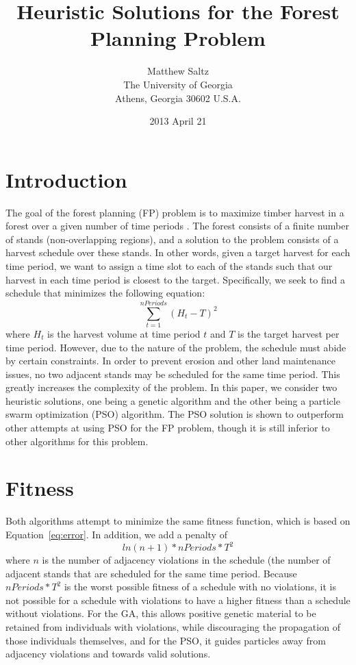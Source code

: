 \documentclass[12pt,fleqn]{article}
\title{\bf Heuristic Solutions for the Forest Planning Problem}
\author{Matthew Saltz \\
        The University of Georgia \\
        Athens, Georgia 30602 U.S.A.}
\date{2013 April 21}
\begin{document}
\maketitle
\section{Introduction}
The goal of the forest planning (FP) problem is to maximize timber harvest
in a forest over a given number of time periods \cite{bettinger}. The forest consists
of a finite number of stands (non-overlapping regions), and a solution
to the problem consists of a harvest schedule over these stands.  In 
other words, given a target harvest for each time period, 
we want to assign a time slot to each of the stands such that our 
harvest in each time period is closest to the target.  Specifically,
we seek to find a schedule that minimizes the following equation:
\begin{equation}
\sum_{t = 1}^{nPeriods} (H_t - T)^2 
\label{eq:error}
\end{equation}
where $H_t$ is the harvest volume at time period $t$ and $T$ is the target
harvest per time period. However, due to the nature of the problem,
the schedule must abide by certain constraints. In order to prevent
erosion and other land maintenance issues, no two adjacent stands
may be scheduled for the same time period. This greatly increases
the complexity of the problem.  In this paper, we consider
two heuristic solutions, one being a genetic algorithm
and the other being a particle swarm optimization (PSO) algorithm. The
PSO solution is shown to outperform other attempts at using PSO for the
FP problem, though it is still inferior to other algorithms for this problem.

\section{Fitness}
Both algorithms attempt to minimize the same fitness function, which is
based on Equation~\ref{eq:error}. In addition, we add a penalty of 
$$ln(n+1) * nPeriods * T^2$$ where $n$ is the number of adjacency violations in 
the schedule (the number of adjacent stands that are scheduled for the same 
time period.  Because $nPeriods * T^2$ is the worst possible
fitness of a schedule with no violations, it is not possible for
a schedule with violations to have a higher fitness than a schedule without
violations. For the GA, this allows positive genetic material to be retained
from individuals with violations, while discouraging the propagation of 
those individuals themselves, and for the PSO, it guides particles away 
from adjacency violations and towards valid solutions.
\end{document}

